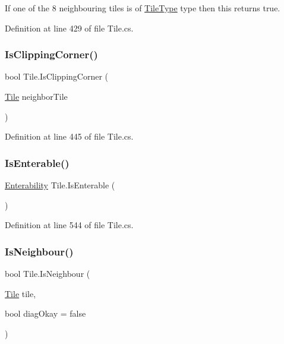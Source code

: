 If one of the 8 neighbouring tiles is of \hyperlink{class_tile_type}{Tile\+Type} type then this returns true. 



Definition at line 429 of file Tile.\+cs.

\mbox{\label{class_tile_a3d66c8afb8475b85d84d1385e9ea2fa1}} 
\subsubsection{\texorpdfstring{Is\+Clipping\+Corner()}{IsClippingCorner()}}
{\footnotesize\ttfamily bool Tile.\+Is\+Clipping\+Corner (\begin{DoxyParamCaption}\item[{\hyperlink{class_tile}{Tile}}]{neighbor\+Tile }\end{DoxyParamCaption})}



Definition at line 445 of file Tile.\+cs.

\mbox{\label{class_tile_a132d1e4646d4e5aedb7a81d6e3003c1d}} 
\subsubsection{\texorpdfstring{Is\+Enterable()}{IsEnterable()}}
{\footnotesize\ttfamily \hyperlink{_tile_8cs_a48a7177f465b04f310ccf25ae69d070a}{Enterability} Tile.\+Is\+Enterable (\begin{DoxyParamCaption}{ }\end{DoxyParamCaption})}



Definition at line 544 of file Tile.\+cs.

\mbox{\label{class_tile_a4f390d0ed829888b1446ec099ab28124}} 
\subsubsection{\texorpdfstring{Is\+Neighbour()}{IsNeighbour()}}
{\footnotesize\ttfamily bool Tile.\+Is\+Neighbour (\begin{DoxyParamCaption}\item[{\hyperlink{class_tile}{Tile}}]{tile,  }\item[{bool}]{diag\+Okay = {\ttfamily false} }\end{DoxyParamCaption})}



